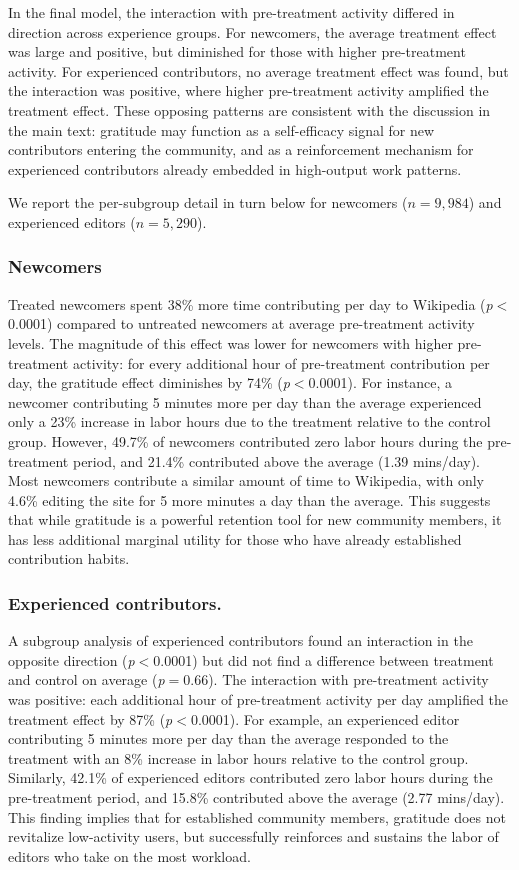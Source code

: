 \documentclass[9pt,twoside,lineno]{pnas-new}
\begin{document}
In the final model, the interaction with pre-treatment activity differed in direction across experience groups. For newcomers, the average treatment effect was large and positive, but diminished for those with higher pre-treatment activity. For experienced contributors, no average treatment effect was found, but the interaction was positive, where higher pre-treatment activity amplified the treatment effect. These opposing patterns are consistent with the discussion in the main text: gratitude may function as a self-efficacy signal for new contributors entering the community, and as a reinforcement mechanism for experienced contributors already embedded in high-output work patterns.

We report the per-subgroup detail in turn below for newcomers ($n=9{,}984$) and experienced editors ($n=5{,}290$).

\subsubsection*{Newcomers} Treated newcomers spent 38\% more time contributing per day to Wikipedia (\textit{p}$<$0.0001) compared to untreated newcomers at average pre-treatment activity levels. The magnitude of this effect was lower for newcomers with higher pre-treatment activity: for every additional hour of pre-treatment contribution per day, the gratitude effect diminishes by 74\% (\textit{p}$<$0.0001). For instance, a newcomer contributing 5 minutes more per day than the average experienced only a 23\% increase in labor hours due to the treatment relative to the control group. However, 49.7\% of newcomers contributed zero labor hours during the pre-treatment period, and 21.4\% contributed above the average (1.39 mins/day). Most newcomers contribute a similar amount of time to Wikipedia, with only 4.6\% editing the site for 5 more minutes a day than the average. This suggests that while gratitude is a powerful retention tool for new community members, it has less additional marginal utility for those who have already established contribution habits.

\subsubsection*{Experienced contributors.} A subgroup analysis of experienced contributors found an interaction in the opposite direction (\textit{p}$<$0.0001) but did not find a difference between treatment and control on average (\textit{p}$=$0.66). The interaction with pre-treatment activity was positive: each additional hour of pre-treatment activity per day amplified the treatment effect by 87\% (\textit{p}$<$0.0001). For example, an experienced editor contributing 5 minutes more per day than the average responded to the treatment with an 8\% increase in labor hours relative to the control group. Similarly, 42.1\% of experienced editors contributed zero labor hours during the pre-treatment period, and 15.8\% contributed above the average (2.77 mins/day). This finding implies that for established community members, gratitude does not revitalize low-activity users, but successfully reinforces and sustains the labor of editors who take on the most workload.
\end{document}
